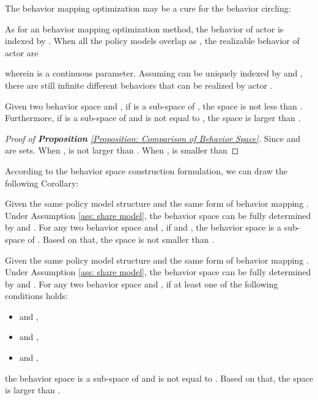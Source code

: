 The behavior mapping optimization may be a cure for the behavior circling:
\begin{Corollary}
\label{Corollary: behavior mapping optimization is an Antidote for Behavior Circling}
As for an behavior mapping optimization method, the behavior of actor  is indexed by . When all the policy models overlap as , the realizable behavior of actor  are 

wherein  is a continuous parameter.
Assuming  can be uniquely indexed by  and , there are still infinite different behaviors that can be realized by actor .
\end{Corollary}


\begin{Proposition}
\label{Proposition: Comparison of Behavior Space}
Given two behavior space  and , if  is a sub-space of , the space   is not less than  . Furthermore, if  is a sub-space of  and  is not equal to , the space   is larger than  .
\end{Proposition}

\begin{proof}[Proof of \textbf{Proposition} \ref{Proposition: Comparison of Behavior Space}]
    Since  and  are sets. When ,  is not larger than . When ,  is smaller than 
\end{proof}

According to the behavior space construction formulation, we can draw the following Corollary:
\begin{Corollary}
\label{Corollary: space not smaller}
        Given the same policy model structure  and the same form of behavior mapping  . Under Assumption \ref{ass: share model}, the behavior space can be fully determined by  and .  For any two behavior space  and , if  and , the behavior space  is a sub-space of . Based on that, the space   is not smaller than  .
\end{Corollary}

\begin{Corollary}
\label{Corollary: space larger}
        Given the same policy model structure  and the same form of behavior mapping  . Under Assumption \ref{ass: share model}, the behavior space can be fully determined by  and .  For any two behavior space  and , if at least one of the following conditions holds: 
        \begin{itemize}
            \item  and , 
            \item  and  ,
            \item  and  ,
        \end{itemize}
        the behavior space  is a sub-space of  and  is not equal to . Based on that, the space   is larger than  .
\end{Corollary}



